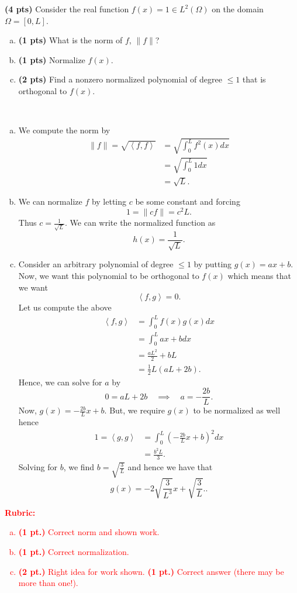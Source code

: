 \documentclass[12pt]{article} %
\newcommand{\innprod}[2]{\left\langle #1, #2\right\rangle}
\begin{document}
\newpage
\begin{problem} \textbf{(4 pts)} Consider the real function $f(x)=1 \in L^2(\Omega)$ on the domain $\Omega = [0,L]$.
	\begin{enumerate}[(a)]
		\item \textbf{(1 pts)} What is the norm of $f$, $\|f\|$?
		\item \textbf{(1 pts)} Normalize $f(x)$.
		\item \textbf{(2 pts)} Find a nonzero normalized polynomial of degree $\leq 1$ that is orthogonal to $f(x)$.
	\end{enumerate}
\end{problem}
\begin{solution}~
	\begin{enumerate}[(a)]
		\item We compute the norm by
		\begin{align*}
			\|f\| = \sqrt{\innprod{f}{f}} &=\sqrt{ \int_0^L f^2(x)dx}\\
			&=\sqrt{ \int_0^L 1 dx}\\
			&= \sqrt{L}.
		\end{align*}
		\item We can normalize $f$ by letting $c$ be some constant and forcing
		\[
		1=\|cf\| = c^2L.
		\]
		Thus $c=\frac{1}{\sqrt{L}}$.  We can write the normalized function as
		\[
		h(x)=\frac{1}{\sqrt{L}}. 
		\]
		\item Consider an arbitrary polynomial of degree $\leq 1$ by putting $g(x)=ax+b$.  Now, we want this polynomial to be orthogonal to $f(x)$ which means that we want
		\[
		\innprod{f}{g}=0.
		\]
		Let us compute the above
		\begin{align*}
			\innprod{f}{g} &= \int_0^L f(x)g(x)dx\\
			&=\int_0^L ax+bdx\\
			&= \frac{aL^2}{2}+bL\\
			&= \frac{1}{2}L\left(aL+2b\right).
		\end{align*}
		Hence, we can solve for $a$ by
		\[
		0=aL+2b \quad \implies \quad a= -\frac{2b}{L}.
		\]
		Now, $g(x)=-\frac{2b}{L}x+b$.  But, we require $g(x)$ to be normalized as well hence
		\begin{align*}
			1=\innprod{g}{g} &= \int_0^L \left(-\frac{2b}{L}x+b\right)^2dx\\
			&= \frac{b^2L}{3}.
		\end{align*}
		Solving for $b$, we find $b=\sqrt{\frac{3}{L}}$ and hence we have that
		\[
		g(x) = -2\sqrt{\frac{3}{L^3}}x+\sqrt{\frac{3}{L}}..
		\]
	\end{enumerate}
\end{solution}
\vspace*{1cm}
\textcolor{red}{
\noindent \textbf{Rubric:}
\begin{enumerate}[(a)]
    \item \textbf{(1 pt.)} Correct norm and shown work.
    \item \textbf{(1 pt.)} Correct normalization.
    \item \textbf{(2 pt.)} Right idea for work shown. \textbf{(1 pt.)} Correct answer (there may be more than one!).
\end{enumerate}
}
\end{document}
